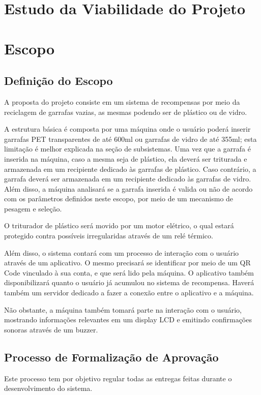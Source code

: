 \section{Estudo da Viabilidade do Projeto}

\section{Escopo}
\subsection{Definição do Escopo}
    A proposta do projeto consiste em um sistema de recompensas por meio da reciclagem de garrafas vazias, as mesmas podendo ser de plástico ou de vidro.

    A estrutura básica é composta por uma máquina onde o usuário poderá inserir garrafas PET transparentes de até 600ml ou garrafas de vidro de até 355ml; esta limitação é melhor explicada na seção de subsistemas. Uma vez que a garrafa é inserida na máquina, caso a mesma seja de plástico, ela deverá ser triturada e armazenada em um recipiente dedicado às garrafas de plástico. Caso contrário, a garrafa deverá ser armazenada em um recipiente dedicado às garrafas de vidro. Além disso, a máquina analisará se a garrafa inserida é valida ou não de acordo com os parâmetros definidos neste escopo, por meio de um mecanismo de pesagem e seleção.

    O triturador de plástico será movido por um motor elétrico, o qual estará protegido contra possíveis irregularidas através de um relé térmico. 

    Além disso, o sistema contará com um processo de interação com o usuário através de um aplicativo. O mesmo precisará se identificar por meio de um QR Code vinculado à sua conta, e que será lido pela máquina. O aplicativo também disponibilizará quanto o usuário já acumulou no sistema de recompensa. Haverá também um servidor dedicado a fazer a conexão entre o aplicativo e a máquina.

    Não obstante, a máquina também tomará parte na interação com o usuário, mostrando informações relevantes em um display LCD e emitindo confirmações sonoras através de um buzzer.

\subsection{Processo de Formalização de Aprovação}
    Este processo tem por objetivo regular todas as entregas feitas durante o desenvolvimento do sistema.

